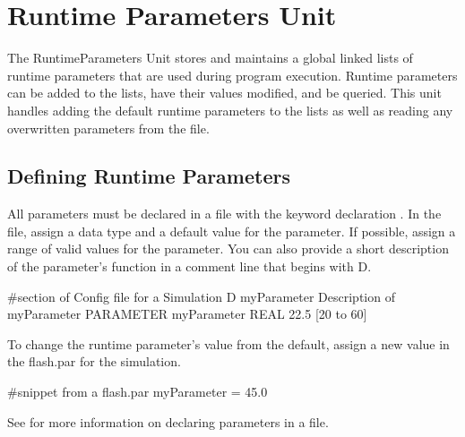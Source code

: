 \chapter{Runtime Parameters Unit}
\label{Chp:Runtime Parameters Unit}


The \unit{RuntimeParameters} Unit stores and maintains a global
linked lists of runtime parameters that are used during program execution.
Runtime parameters can be added to
the lists, have their values modified, and be queried.
This unit handles adding the default runtime parameters to the lists as well as
reading any overwritten parameters from the
 file.


\section{Defining Runtime Parameters}
All parameters must be declared in a  file
with the keyword declaration .
In the  file, assign a data type and a default value for the parameter.  If possible,
assign a range of valid values for the parameter.  You can also provide a short description
of the parameter's function in a comment line that begins with D.
\begin{shrink}
\begin{codeseg}
#section of Config file for a Simulation
D myParameter Description of myParameter
PARAMETER myParameter REAL 22.5  [20 to 60]
\end{codeseg}
\end{shrink}
To change
the runtime parameter's value from the default, assign a new value in the
flash.par for the simulation.
\begin{shrink}
\begin{codeseg}
#snippet from a flash.par
myParameter = 45.0
\end{codeseg}
\end{shrink}
See 
for more information on declaring parameters in a  file.

